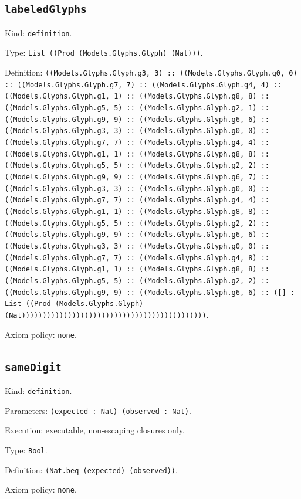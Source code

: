 \documentclass[11pt]{article}
\begin{document}
\subsection*{\texttt{labeledGlyphs}}
\noindent Kind: \texttt{definition}.\par
\noindent Type: \texttt{List ((Prod (Models.Glyphs.Glyph) (Nat)))}.\par
\noindent Definition: \texttt{((Models.Glyphs.Glyph.g3, 3) :: ((Models.Glyphs.Glyph.g0, 0) :: ((Models.Glyphs.Glyph.g7, 7) :: ((Models.Glyphs.Glyph.g4, 4) :: ((Models.Glyphs.Glyph.g1, 1) :: ((Models.Glyphs.Glyph.g8, 8) :: ((Models.Glyphs.Glyph.g5, 5) :: ((Models.Glyphs.Glyph.g2, 1) :: ((Models.Glyphs.Glyph.g9, 9) :: ((Models.Glyphs.Glyph.g6, 6) :: ((Models.Glyphs.Glyph.g3, 3) :: ((Models.Glyphs.Glyph.g0, 0) :: ((Models.Glyphs.Glyph.g7, 7) :: ((Models.Glyphs.Glyph.g4, 4) :: ((Models.Glyphs.Glyph.g1, 1) :: ((Models.Glyphs.Glyph.g8, 8) :: ((Models.Glyphs.Glyph.g5, 5) :: ((Models.Glyphs.Glyph.g2, 2) :: ((Models.Glyphs.Glyph.g9, 9) :: ((Models.Glyphs.Glyph.g6, 7) :: ((Models.Glyphs.Glyph.g3, 3) :: ((Models.Glyphs.Glyph.g0, 0) :: ((Models.Glyphs.Glyph.g7, 7) :: ((Models.Glyphs.Glyph.g4, 4) :: ((Models.Glyphs.Glyph.g1, 1) :: ((Models.Glyphs.Glyph.g8, 8) :: ((Models.Glyphs.Glyph.g5, 5) :: ((Models.Glyphs.Glyph.g2, 2) :: ((Models.Glyphs.Glyph.g9, 9) :: ((Models.Glyphs.Glyph.g6, 6) :: ((Models.Glyphs.Glyph.g3, 3) :: ((Models.Glyphs.Glyph.g0, 0) :: ((Models.Glyphs.Glyph.g7, 7) :: ((Models.Glyphs.Glyph.g4, 8) :: ((Models.Glyphs.Glyph.g1, 1) :: ((Models.Glyphs.Glyph.g8, 8) :: ((Models.Glyphs.Glyph.g5, 5) :: ((Models.Glyphs.Glyph.g2, 2) :: ((Models.Glyphs.Glyph.g9, 9) :: ((Models.Glyphs.Glyph.g6, 6) :: ([] : List ((Prod (Models.Glyphs.Glyph) (Nat))))))))))))))))))))))))))))))))))))))))))))}.\par
\noindent Axiom policy: \texttt{none}.\par
\subsection*{\texttt{sameDigit}}
\noindent Kind: \texttt{definition}.\par
\noindent Parameters: \texttt{(expected : Nat) (observed : Nat)}.\par
\noindent Execution: executable, non-escaping closures only.\par
\noindent Type: \texttt{Bool}.\par
\noindent Definition: \texttt{(Nat.beq (expected) (observed))}.\par
\noindent Axiom policy: \texttt{none}.\par
\end{document}
